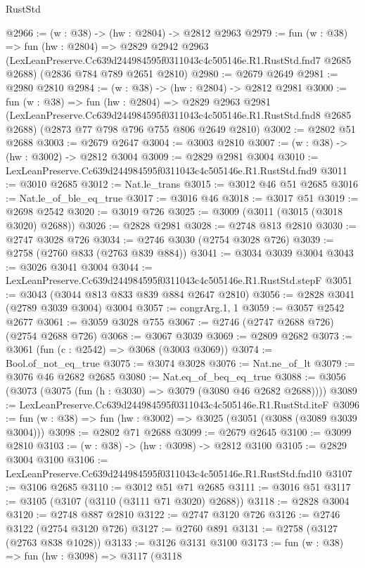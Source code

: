\begin{lexlean}{RustStd}
\begin{coremodule}
@2966 := (w : @38) -> (hw : @2804) -> @2812 @2963
@2979 := fun (w : @38) =>
  fun (hw : @2804) =>
  @2829
    @2942
    @2963
    (LexLeanPreserve.Cc639d244984595f0311043c4c505146e.R1.RustStd.fnd7 @2685 @2688)
    (@2836 @784 @789 @2651 @2810)
@2980 := @2679 @2649
@2981 := @2980 @2810
@2984 := (w : @38) -> (hw : @2804) -> @2812 @2981
@3000 := fun (w : @38) =>
  fun (hw : @2804) =>
  @2829
    @2963
    @2981
    (LexLeanPreserve.Cc639d244984595f0311043c4c505146e.R1.RustStd.fnd8 @2685 @2688)
    (@2873 @77 @798 @796 @755 @806 @2649 @2810)
@3002 := @2802 @51 @2688
@3003 := @2679 @2647
@3004 := @3003 @2810
@3007 := (w : @38) -> (hw : @3002) -> @2812 @3004
@3009 := @2829 @2981 @3004
@3010 := LexLeanPreserve.Cc639d244984595f0311043c4c505146e.R1.RustStd.fnd9
@3011 := @3010 @2685
@3012 := Nat.le_trans
@3015 := @3012 @46 @51 @2685
@3016 := Nat.le_of_ble_eq_true
@3017 := @3016 @46
@3018 := @3017 @51
@3019 := @2698 @2542
@3020 := @3019 @726
@3025 := @3009 (@3011 (@3015 (@3018 @3020) @2688))
@3026 := @2828 @2981
@3028 := @2748 @813 @2810
@3030 := @2747 @3028 @726
@3034 := @2746 @3030 (@2754 @3028 @726)
@3039 := @2758 (@2760 @833 (@2763 @839 @884))
@3041 := @3034 @3039 @3004
@3043 := @3026 @3041 @3004
@3044 := LexLeanPreserve.Cc639d244984595f0311043c4c505146e.R1.RustStd.stepF
@3051 := @3043 (@3044 @813 @833 @839 @884 @2647 @2810)
@3056 := @2828 @3041 (@2789 @3039 @3004) @3004
@3057 := congrArg.{1, 1}
@3059 := @3057 @2542 @2677
@3061 := @3059 @3028 @755
@3067 := @2746 (@2747 @2688 @726) (@2754 @2688 @726)
@3068 := @3067 @3039
@3069 := @2809 @2682
@3073 := @3061 (fun (c : @2542) => @3068 (@3003 @3069))
@3074 := Bool.of_not_eq_true
@3075 := @3074 @3028
@3076 := Nat.ne_of_lt
@3079 := @3076 @46 @2682 @2685
@3080 := Nat.eq_of_beq_eq_true
@3088 := @3056 (@3073 (@3075 (fun (h : @3030) => @3079 (@3080 @46 @2682 @2688))))
@3089 := LexLeanPreserve.Cc639d244984595f0311043c4c505146e.R1.RustStd.iteF
@3096 := fun (w : @38) => fun (hw : @3002) => @3025 (@3051 (@3088 (@3089 @3039 @3004)))
@3098 := @2802 @71 @2688
@3099 := @2679 @2645
@3100 := @3099 @2810
@3103 := (w : @38) -> (hw : @3098) -> @2812 @3100
@3105 := @2829 @3004 @3100
@3106 := LexLeanPreserve.Cc639d244984595f0311043c4c505146e.R1.RustStd.fnd10
@3107 := @3106 @2685
@3110 := @3012 @51 @71 @2685
@3111 := @3016 @51
@3117 := @3105 (@3107 (@3110 (@3111 @71 @3020) @2688))
@3118 := @2828 @3004
@3120 := @2748 @887 @2810
@3122 := @2747 @3120 @726
@3126 := @2746 @3122 (@2754 @3120 @726)
@3127 := @2760 @891
@3131 := @2758 (@3127 (@2763 @838 @1028))
@3133 := @3126 @3131 @3100
@3173 := fun (w : @38) =>
  fun (hw : @3098) =>
  @3117
    (@3118

\end{coremodule}
\end{lexlean}
